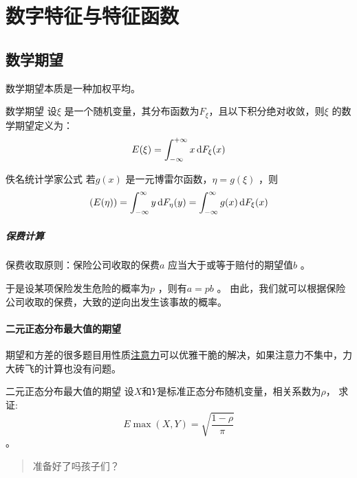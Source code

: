 \chapter{数字特征与特征函数}
\section{数学期望}
数学期望本质是一种加权平均。

\begin{definition}{数学期望}
    设\(\xi\) 是一个随机变量，其分布函数为\(F_{\xi}\)，且以下积分绝对收敛，则\(\xi\) 的数学期望定义为：
    \[
        E(\xi) = \int_{-\infty}^{+\infty} x \d{F_{\xi}}(x)
    \]
\end{definition}


\begin{theorem}{佚名统计学家公式}
    若\(g(x)\) 是一元博雷尔函数，\(\eta=g(\xi)\) ，则\[
        (E(\eta)) = \int_{-\infty}^{\infty} y \d{F_{\eta}}(y) =
        \int_{-\infty}^{\infty} g(x) \d{F_{\xi}}(x)
    \]
\end{theorem}

\paragraph{保费计算}
保费收取原则：保险公司收取的保费\(a\) 应当大于或等于赔付的期望值\(b\) 。

于是设某项保险发生危险的概率为\(p\) ，则有\(a=pb\) 。
由此，我们就可以根据保险公司收取的保费，大致的逆向出发生该事故的概率。

\subsubsection{二元正态分布最大值的期望}
期望和方差的很多题目用性质\underline{注意力}可以优雅干脆的解决，如果注意力不集中，力大砖飞的计算也没有问题。

\begin{problem}{二元正态分布最大值的期望}
    设\(X\)和\(Y\)是标准正态分布随机变量，相关系数为\(\rho\)，
    求证:\[E\max(X,Y)= \sqrt{\frac{1-\rho}{\pi}}\]。
\end{problem}

\begin{quote}
    准备好了吗孩子们？
\end{quote}


